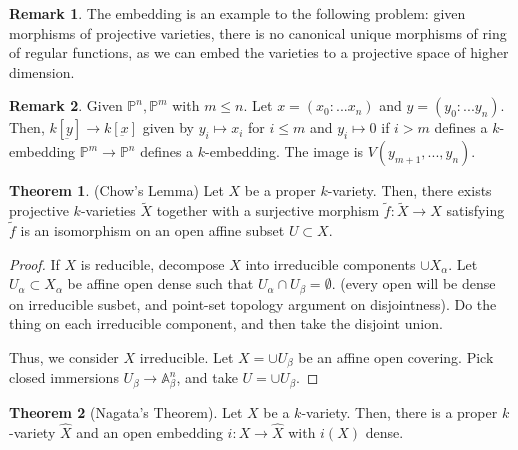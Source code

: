 \documentclass{article}
\theoremstyle{definition}
\newtheorem{theorem}{Theorem}[section]
\theoremstyle{definition}
\theoremstyle{definition}
\newtheorem{remark}{Remark}[theorem]
\theoremstyle{definition}
\theoremstyle{definition}
\theoremstyle{definition}
\theoremstyle{definition}
\begin{document}
\begin{tcolorbox}[colback=green!5!white,colframe=green!30!white]
\begin{remark}
The embedding is an example to the following problem: given morphisms of projective varieties, there is no canonical unique morphisms of ring of regular functions, as we can embed the varieties to a projective space of higher dimension. 
\end{remark}
\end{tcolorbox}


\begin{tcolorbox}[colback=green!5!white,colframe=green!30!white]
\begin{remark}
Given $\mathbb{P}^n, \mathbb{P}^m$ with $m\leq n$. Let $x=(x_0:...x_n)$ and $y=(y_0:...y_n)$. Then, $k[\underbar{y}]\to k[\underbar{x}]$ given by $y_i\mapsto x_i$ for $i\leq m$ and $y_i\mapsto 0$ if $i>m$ defines a $k$-embedding $\mathbb{P}^m\to \mathbb{P}^n$ defines a $k$-embedding. The image is $V(y_{m+1},...,y_n)$. 
\end{remark}
\end{tcolorbox}



\begin{tcolorbox}[colback=red!5!white,colframe=red!30!white]
\begin{theorem}(Chow's Lemma)
Let $X$ be a proper $k$-variety. Then, there exists projective $k$-varieties $\tilde{X}$ together with a surjective morphism $\tilde{f}: \tilde{X}\to X$ satisfying $\tilde{f}$ is an isomorphism on an open affine subset $U\subset X$. 
\end{theorem}
\end{tcolorbox}
\begin{proof}
    If $X$ is reducible, decompose $X$ into irreducible components $\cup X_{\alpha}$. Let $U_{\alpha}\subset X_{\alpha}$ be affine open dense such that $U_{\alpha}\cap U_{\beta}=\emptyset$. (every open will be dense on irreducible susbet, and point-set topology argument on disjointness). Do the thing on each irreducible component, and then take the disjoint union. 

    Thus, we consider $X$ irreducible. Let $X=\cup U_{\beta}$ be an affine open covering. Pick closed immersions $U_{\beta}\to \mathbb{A}_{\beta}^n$, and take $U=\cup U_{\beta}$. 
\end{proof}








\begin{tcolorbox}[colback=red!5!white,colframe=red!30!white]
\begin{theorem}[Nagata's Theorem]
Let $X$ be a $k$-variety. Then, there is a proper $k$-variety $\widehat{X}$ and an open embedding $i: X\to \widehat{X}$ with $i(X)$ dense. 
\end{theorem}
\end{tcolorbox}
\end{document}
